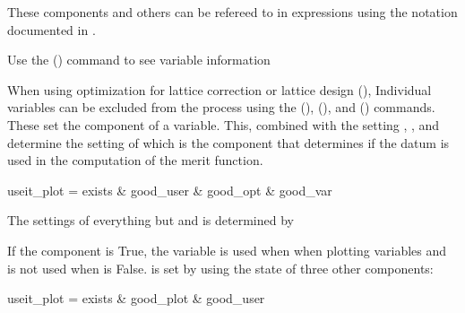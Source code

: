 These components and others can be refereed to in expressions using the notation documented
in .

Use the  () command to see variable information

When using optimization for lattice correction or lattice design
(), Individual variables can be excluded from the process
using the  (),  (),
and  () commands. These set the 
component of a variable. This, combined with the setting ,
, and  determine the setting of
 which is the component that determines if the datum is
used in the computation of the merit function. 
\begin{example}
  useit_plot = exists \& good_user \& good_opt \& good_var
\end{example}
The settings of everything but  and  is determined by \tao

If the  component is True, the variable is used when when plotting
variables and is not used when  is False.  is set
by \tao using the state of three other components:
\begin{example}
  useit_plot = exists \& good_plot \& good_user
\end{example}
